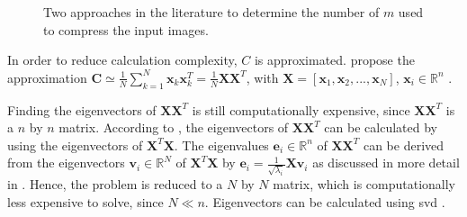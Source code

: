 \begin{figure}%
    \centering
    \qquad
    \caption{Two approaches in the literature to determine the number of \eigenfaces{} $m$ used to compress the input images.}%
    \label{fig:det_n_comp}%
\end{figure}

In order to reduce calculation complexity, $C$ is approximated.
\citeauthor{eigenfaces1997} propose the approximation $\textbf{C} \simeq \frac{1}{N}\sum_{k=1}^{N}\textbf{x}_{k}\textbf{x}_{k}^{T} = \frac{1}{N}\textbf{X}\textbf{X}^{T}$, 
with $\textbf{X} = \left[ \textbf{x}_{1}, \textbf{x}_{2}, ..., \textbf{x}_{N} \right]$, $\textbf{x}_i \in \mathbb{R}^{n}$ \cite{eigenfaces1997}.

Finding the eigenvectors of $\textbf{X}\textbf{X}^{T}$ is still computationally expensive, since $\textbf{X}\textbf{X}^{T}$ is a $n$ by $n$ matrix.
According to \citeauthor{eigenfaces1997}, the eigenvectors of $\textbf{X}\textbf{X}^{T}$ can be calculated by using the eigenvectors of $\textbf{X}^{T}\textbf{X}$.
The eigenvalues $\textbf{e}_i \in \mathbb{R}^{n}$ of $\textbf{X}\textbf{X}^{T}$ can be derived from the eigenvectors $\textbf{v}_i \in \mathbb{R}^{N}$ of $\textbf{X}^{T}\textbf{X}$ by 
$\textbf{e}_i = \frac{1}{\sqrt{\lambda_i}}\textbf{X}\textbf{v}_i$ as discussed in more detail in \cite{eigenfaces1997}.
Hence, the problem is reduced to a $N$ by $N$ matrix, which is computationally less expensive to solve, since $N \ll n$.
Eigenvectors can be calculated using \ac{svd} \cite{eigenfaces1997}.

